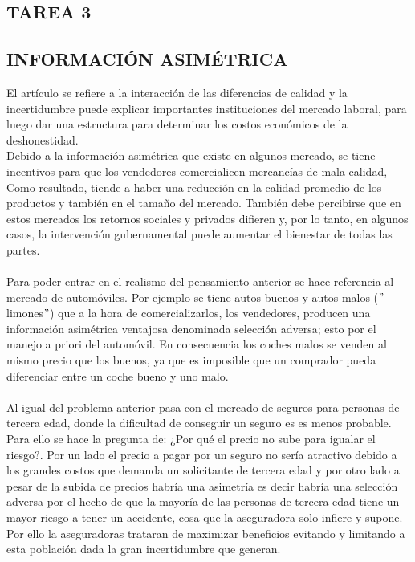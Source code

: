 \subsection*{\center TAREA 3}
\vspace{.4cm}
\subsection*{\center INFORMACIÓN ASIMÉTRICA}
\vspace{1cm}

\begin{multicols}{2}

El artículo se refiere a la interacción de las diferencias de calidad y la incertidumbre puede explicar importantes instituciones del mercado laboral, para luego dar una estructura para determinar los costos económicos de la deshonestidad.\\ 
 Debido a la información asimétrica que existe en algunos mercado, se tiene incentivos para que los vendedores comercialicen mercancías de mala calidad, Como resultado, tiende a haber una reducción en la calidad promedio de los productos y también en el tamaño del mercado. También debe percibirse que en estos mercados los retornos sociales y privados difieren y, por lo tanto, en algunos casos, la intervención gubernamental puede aumentar el bienestar de todas las partes. \\\\
 Para poder entrar en el realismo del pensamiento anterior se hace referencia al mercado de automóviles. Por ejemplo se tiene autos buenos y autos malos ($"$limones$"$) que a la hora de comercializarlos, los vendedores, producen una información asimétrica ventajosa denominada selección adversa; esto por el manejo a priori del automóvil. En consecuencia los coches malos se venden al mismo precio que los buenos, ya que es imposible que un comprador pueda diferenciar entre un coche bueno y uno malo.\\\\
 Al igual del problema anterior pasa con el mercado de seguros para personas de tercera edad, donde la dificultad de conseguir un seguro es es menos probable. Para ello se hace la pregunta de: ¿Por qué el precio no sube para igualar el riesgo?. Por un lado el precio a pagar por un seguro no sería atractivo debido a los grandes costos que demanda un solicitante de tercera edad y por otro lado a pesar de la subida de precios habría una asimetría  es decir habría una selección adversa por el hecho de que la mayoría de las personas de tercera edad tiene un mayor riesgo a tener un accidente, cosa que la aseguradora solo infiere y supone. Por ello la aseguradoras trataran de maximizar beneficios evitando  y limitando a esta población dada la gran incertidumbre que generan.\\\\

\end{multicols}
